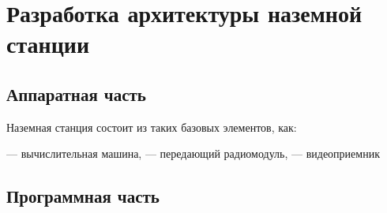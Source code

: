 
\section{Разработка архитектуры наземной станции}
\subsection{Аппаратная часть}
Наземная станция состоит из таких базовых элементов, как:

--- вычислительная машина,
--- передающий радиомодуль,
--- видеоприемник

\subsection{Программная часть}
